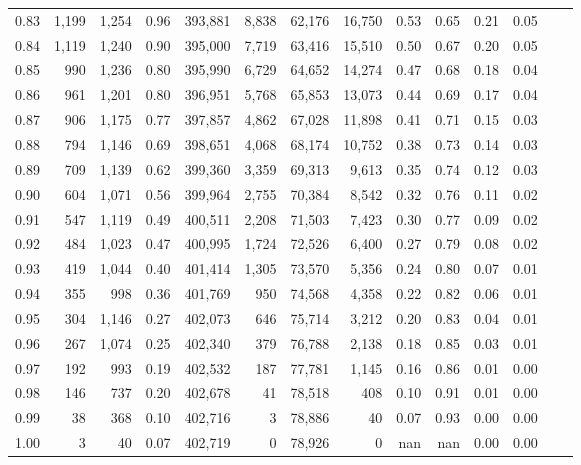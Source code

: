 \begin{tabular}{rrrrrrrrrrrrrr}
0.83 &  1,199 &  1,254 &    0.96 &  393,881 &    8,838 &  62,176 &  16,750 &  0.53 &  0.65 &  0.21 &      0.05 \\
0.84 &  1,119 &  1,240 &    0.90 &  395,000 &    7,719 &  63,416 &  15,510 &  0.50 &  0.67 &  0.20 &      0.05 \\
0.85 &    990 &  1,236 &    0.80 &  395,990 &    6,729 &  64,652 &  14,274 &  0.47 &  0.68 &  0.18 &      0.04 \\
0.86 &    961 &  1,201 &    0.80 &  396,951 &    5,768 &  65,853 &  13,073 &  0.44 &  0.69 &  0.17 &      0.04 \\
0.87 &    906 &  1,175 &    0.77 &  397,857 &    4,862 &  67,028 &  11,898 &  0.41 &  0.71 &  0.15 &      0.03 \\
0.88 &    794 &  1,146 &    0.69 &  398,651 &    4,068 &  68,174 &  10,752 &  0.38 &  0.73 &  0.14 &      0.03 \\
0.89 &    709 &  1,139 &    0.62 &  399,360 &    3,359 &  69,313 &   9,613 &  0.35 &  0.74 &  0.12 &      0.03 \\
0.90 &    604 &  1,071 &    0.56 &  399,964 &    2,755 &  70,384 &   8,542 &  0.32 &  0.76 &  0.11 &      0.02 \\
0.91 &    547 &  1,119 &    0.49 &  400,511 &    2,208 &  71,503 &   7,423 &  0.30 &  0.77 &  0.09 &      0.02 \\
0.92 &    484 &  1,023 &    0.47 &  400,995 &    1,724 &  72,526 &   6,400 &  0.27 &  0.79 &  0.08 &      0.02 \\
0.93 &    419 &  1,044 &    0.40 &  401,414 &    1,305 &  73,570 &   5,356 &  0.24 &  0.80 &  0.07 &      0.01 \\
0.94 &    355 &    998 &    0.36 &  401,769 &      950 &  74,568 &   4,358 &  0.22 &  0.82 &  0.06 &      0.01 \\
0.95 &    304 &  1,146 &    0.27 &  402,073 &      646 &  75,714 &   3,212 &  0.20 &  0.83 &  0.04 &      0.01 \\
0.96 &    267 &  1,074 &    0.25 &  402,340 &      379 &  76,788 &   2,138 &  0.18 &  0.85 &  0.03 &      0.01 \\
0.97 &    192 &    993 &    0.19 &  402,532 &      187 &  77,781 &   1,145 &  0.16 &  0.86 &  0.01 &      0.00 \\
0.98 &    146 &    737 &    0.20 &  402,678 &       41 &  78,518 &     408 &  0.10 &  0.91 &  0.01 &      0.00 \\
0.99 &     38 &    368 &    0.10 &  402,716 &        3 &  78,886 &      40 &  0.07 &  0.93 &  0.00 &      0.00 \\
1.00 &      3 &     40 &    0.07 &  402,719 &        0 &  78,926 &       0 &   nan &   nan &  0.00 &      0.00 \\
\bottomrule
\end{tabular}
